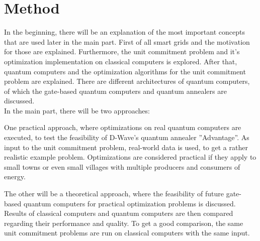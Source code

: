 \section{Method}

In the beginning, there will be an explanation of the most important concepts
that are used later in the main part.
First of all smart grids and the motivation for those are explained.
Furthermore, the unit commitment problem and it's optimization implementation on classical computers
is explored.
After that, quantum computers and the optimization algorithms for the unit commitment problem are explained.
There are different architectures of quantum computers,
of which the gate-based quantum computers and quantum annealers are discussed. \\

\noindent In the main part, there will be two approaches:

One practical approach, where optimizations on real quantum computers are executed,
to test the feasibility of D-Wave's quantum annealer ''Advantage''.
As input to the unit commitment problem, real-world data is used, to get a rather realistic example problem.
Optimizations are considered practical if they apply to small towns or even small villages
with multiple producers and consumers of energy.

The other will be a theoretical approach, where the feasibility of future gate-based quantum computers
for practical optimization problems is discussed. \\

Results of classical computers and quantum computers are then compared
regarding their performance and quality.
To get a good comparison, the same unit commitment problems are run on classical computers with the same input.
